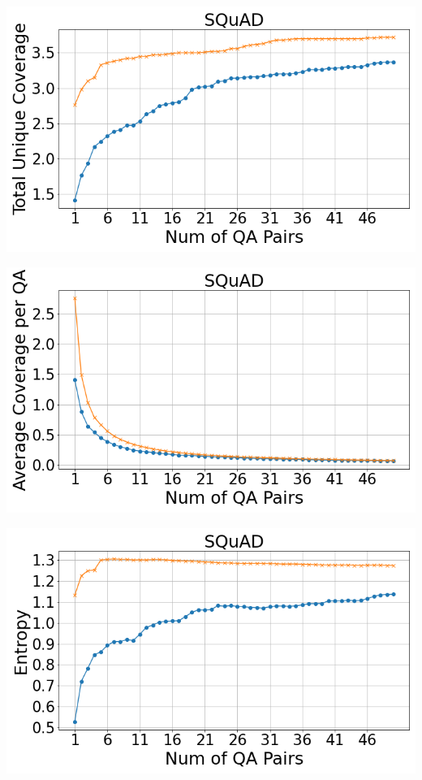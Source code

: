 \documentclass[11pt]{article}
\begin{document}
\noindent
\begin{minipage}{0.33\textwidth}
    \includegraphics[width=\linewidth]{submissions/Tung2023/figs/Squad_Total Unique Coverage.png}
    \label{fig:squad-total-unique-coverage}
\end{minipage}%
\begin{minipage}{0.33\textwidth}
    \includegraphics[width=\linewidth]{submissions/Tung2023/figs/Squad_Average Coverage per QA.png}
    \label{fig:squad-avg-cov-per-qa}
\end{minipage}%
\begin{minipage}{0.33\textwidth}
    \includegraphics[width=\linewidth]{submissions/Tung2023/figs/Squad_Entropy.png}
    \label{fig:squad-entropy}
\end{minipage}
\end{document}
